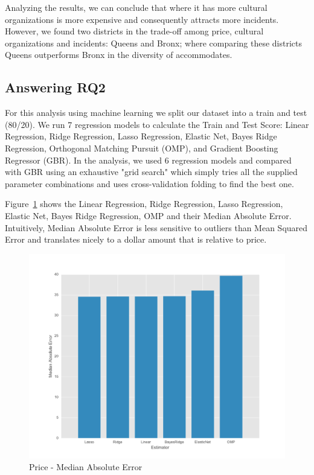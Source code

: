 \documentclass[sigconf]{acmart}
\begin{document}
Analyzing the results, we can conclude that where it has more cultural organizations is more expensive and consequently attracts more incidents. However, we found two districts in the trade-off among price, cultural organizations and incidents: Queens and Bronx; where comparing these districts Queens outperforms Bronx in the diversity of accommodates.

\subsection{Answering RQ2}

For this analysis using machine learning we split our dataset into a train and test (80/20). We run 7 regression models to calculate the Train and Test Score: Linear Regression, Ridge Regression, Lasso Regression, Elastic Net, Bayes Ridge Regression, Orthogonal Matching Pursuit (OMP), and Gradient Boosting Regressor (GBR). In the analysis, we used 6 regression models and compared with GBR using an exhaustive "grid search" which simply tries all the supplied parameter combinations and uses cross-validation folding to find the best one.

Figure~\ref{fig:medianabsoluteerrorprice} shows the Linear Regression, Ridge Regression, Lasso Regression, Elastic Net, Bayes Ridge Regression, OMP and their Median Absolute Error. Intuitively, Median Absolute Error is less sensitive to outliers than Mean Squared Error and translates nicely to a dollar amount that is relative to price.

\begin{figure}[!htpb]
	\centering
	\includegraphics[width=\linewidth]{images/median_absolute_error_price}
	\caption{Price - Median Absolute Error}
	\label{fig:medianabsoluteerrorprice}
\end{figure}
\end{document}
